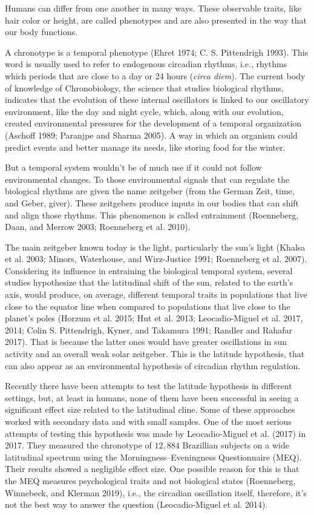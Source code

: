 \documentclass[
  12pt,
  a4paper,
  oneside]{tesesusp}
\begin{document}
Humans can differ from one another in many ways. These observable
traits, like hair color or height, are called phenotypes and are also
presented in the way that our body functions.

A chronotype is a temporal phenotype (Ehret 1974; C. S. Pittendrigh
1993). This word is usually used to refer to endogenous circadian
rhythms, i.e., rhythms which periods that are close to a day or 24 hours
(\emph{circa diem}). The current body of knowledge of Chronobiology, the
science that studies biological rhythms, indicates that the evolution of
these internal oscillators is linked to our oscillatory environment,
like the day and night cycle, which, along with our evolution, created
environmental pressures for the development of a temporal organization
(Aschoff 1989; Paranjpe and Sharma 2005). A way in which an organism
could predict events and better manage its needs, like storing food for
the winter.

But a temporal system wouldn't be of much use if it could not follow
environmental changes. To those environmental signals that can regulate
the biological rhythms are given the name zeitgeber (from the German
Zeit, time, and Geber, giver). These zeitgebers produce inputs in our
bodies that can shift and align those rhythms. This phenomenon is called
entrainment (Roenneberg, Daan, and Merrow 2003; Roenneberg et al. 2010).

The main zeitgeber known today is the light, particularly the sun's
light (Khalsa et al. 2003; Minors, Waterhouse, and Wirz-Justice 1991;
Roenneberg et al. 2007). Considering its influence in entraining the
biological temporal system, several studies hypothesize that the
latitudinal shift of the sun, related to the earth's axis, would
produce, on average, different temporal traits in populations that live
close to the equator line when compared to populations that live close
to the planet's poles (Horzum et al. 2015; Hut et al. 2013;
Leocadio-Miguel et al. 2017, 2014; Colin S. Pittendrigh, Kyner, and
Takamura 1991; Randler and Rahafar 2017). That is because the latter
ones would have greater oscillations in sun activity and an overall weak
solar zeitgeber. This is the latitude hypothesis, that can also appear
as an environmental hypothesis of circadian rhythm regulation.

Recently there have been attempts to test the latitude hypothesis in
different settings, but, at least in humans, none of them have been
successful in seeing a significant effect size related to the
latitudinal cline. Some of these approaches worked with secondary data
and with small samples. One of the most serious attempts of testing this
hypothesis was made by Leocadio-Miguel et al. (2017) in 2017. They
measured the chronotype of \(12,884\) Brazillian subjects on a wide
latitudinal spectrum using the Morningness--Eveningness Questionnaire
(MEQ). Their results showed a negligible effect size. One possible
reason for this is that the MEQ measures psychological traits and not
biological states (Roenneberg, Winnebeck, and Klerman 2019), i.e., the
circadian oscillation itself, therefore, it's not the best way to answer
the question (Leocadio-Miguel et al. 2014).
\end{document}

